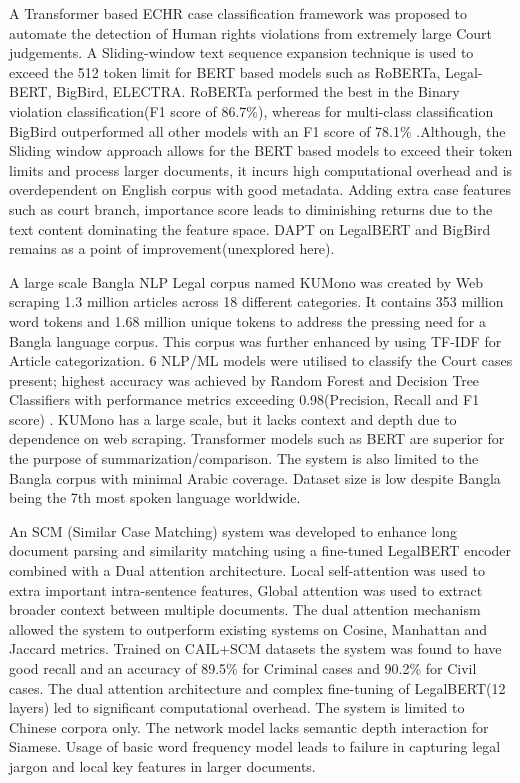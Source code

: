 A Transformer based ECHR case classification framework was proposed to automate the detection of Human rights violations from extremely large Court judgements. A Sliding-window text sequence expansion technique is used to exceed the 512 token limit for BERT based models such as RoBERTa, Legal-BERT, BigBird, ELECTRA. RoBERTa performed the best in the Binary violation classification(F1 score of 86.7\%), whereas for multi-class classification BigBird outperformed all other models with an F1 score of 78.1\% \cite{b9}.Although, the Sliding window approach allows for the BERT based models to exceed their token limits and process larger documents, it incurs high computational overhead and is overdependent on English corpus with good metadata. Adding extra case features such as court branch, importance score leads to diminishing returns due to the text content dominating the feature space. DAPT on LegalBERT and BigBird remains as a point of improvement(unexplored here).


A large scale Bangla NLP Legal corpus named KUMono was created by Web scraping 1.3 million articles across 18 different categories. It contains 353 million word tokens and 1.68 million unique tokens to address the pressing need for a Bangla language corpus. This corpus was further enhanced by using TF-IDF for Article categorization. 6 NLP/ML models were utilised to classify the Court cases present; highest accuracy was achieved by Random Forest and Decision Tree Classifiers with performance metrics exceeding 0.98(Precision, Recall and F1 score) \cite{b10}. KUMono has a large scale, but it lacks context and depth due to dependence on web scraping. Transformer models such as BERT are superior for the purpose of summarization/comparison. The system is also limited to the Bangla corpus with minimal Arabic coverage. Dataset size is low despite Bangla being the 7th most spoken language worldwide.




An SCM (Similar Case Matching) system was developed to enhance long document parsing and similarity matching using a fine-tuned LegalBERT encoder combined with a Dual attention architecture. Local self-attention was used to extra important intra-sentence features, Global attention was used to extract broader context between multiple documents\cite{b11}. The dual attention mechanism allowed the system to outperform existing systems on Cosine, Manhattan and Jaccard metrics. Trained on CAIL+SCM datasets the system was found to have good recall and an accuracy of 89.5\% for Criminal cases and 90.2\% for Civil cases. The dual attention architecture and complex fine-tuning of LegalBERT(12 layers) led to significant computational overhead. The system is limited to Chinese corpora only. The network model lacks semantic depth interaction for Siamese. Usage of basic word frequency model leads to failure in capturing legal jargon and local key features in larger documents.	


